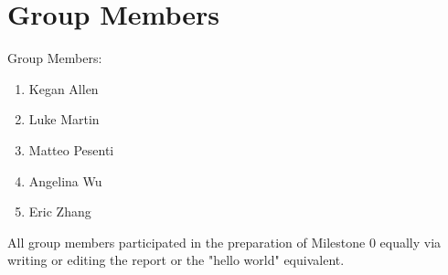 \documentclass{article}
\begin{document}
\section{Group Members}

Group Members:
\begin{enumerate}
    \item Kegan Allen
    \item Luke Martin
    \item Matteo Pesenti
    \item Angelina Wu
    \item Eric Zhang
\end{enumerate}

\noindent All group members participated in the preparation of Milestone 0 equally via writing or editing the report or the "hello world" equivalent.
\end{document}
